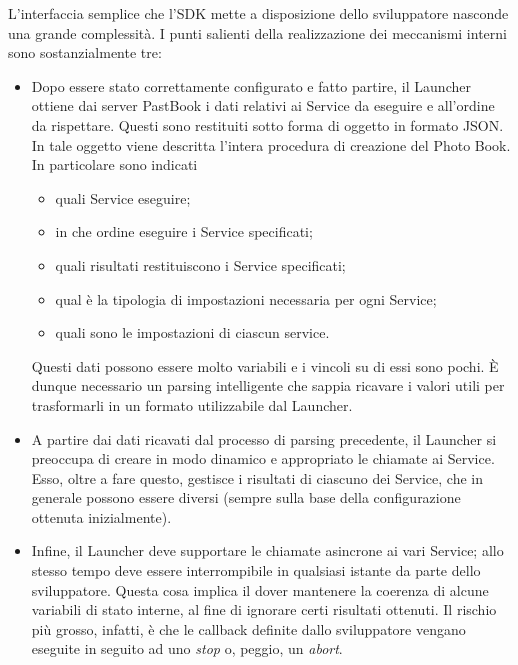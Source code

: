 				L'interfaccia semplice che l'SDK mette a disposizione dello sviluppatore nasconde una grande complessità. I punti
				salienti della realizzazione dei meccanismi interni sono sostanzialmente tre:
				\begin{itemize}
					\item Dopo essere stato correttamente configurato e fatto partire, il Launcher ottiene dai server PastBook i
					dati relativi ai Service da eseguire e all'ordine da rispettare. Questi sono restituiti sotto forma di
					oggetto in formato JSON. In tale oggetto viene descritta l'intera procedura di creazione del Photo Book.
					In particolare sono indicati
					\begin{itemize}
						\item quali Service eseguire;
						\item in che ordine eseguire i Service specificati;
						\item quali risultati restituiscono i Service specificati;
						\item qual è la tipologia di impostazioni necessaria per ogni Service;
						\item quali sono le impostazioni di ciascun service.
					\end{itemize}
					Questi dati possono essere molto variabili e i vincoli su di essi sono pochi. È dunque necessario un parsing
					intelligente che sappia ricavare i valori utili per trasformarli in un formato utilizzabile dal Launcher.
					\item A partire dai dati ricavati dal processo di parsing precedente, il Launcher si preoccupa di creare in
					modo dinamico e appropriato le chiamate ai Service. Esso, oltre a fare questo, gestisce i risultati di
					ciascuno dei Service, che in generale possono essere diversi (sempre sulla base della configurazione
					ottenuta inizialmente).
					\item Infine, il Launcher deve supportare le chiamate asincrone ai vari Service; allo stesso tempo deve essere
					interrompibile in qualsiasi istante da parte dello sviluppatore. Questa cosa implica il dover mantenere la
					coerenza di alcune variabili di stato interne, al fine di ignorare certi risultati ottenuti. Il rischio più
					grosso, infatti, è che le callback definite dallo sviluppatore vengano eseguite in seguito ad uno
					\emph{stop} o, peggio, un \emph{abort}.
				\end{itemize}
